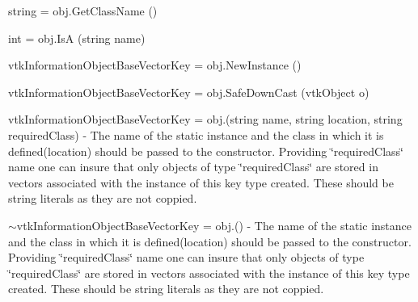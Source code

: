 \begin{DoxyItemize}
\item {\ttfamily string = obj.\-Get\-Class\-Name ()}  
\item {\ttfamily int = obj.\-Is\-A (string name)}  
\item {\ttfamily vtk\-Information\-Object\-Base\-Vector\-Key = obj.\-New\-Instance ()}  
\item {\ttfamily vtk\-Information\-Object\-Base\-Vector\-Key = obj.\-Safe\-Down\-Cast (vtk\-Object o)}  
\item {\ttfamily vtk\-Information\-Object\-Base\-Vector\-Key = obj.(string name, string location, string required\-Class)} -\/ The name of the static instance and the class in which it is defined(location) should be passed to the constructor. Providing \char`\"{}required\-Class\char`\"{} name one can insure that only objects of type \char`\"{}required\-Class\char`\"{} are stored in vectors associated with the instance of this key type created. These should be string literals as they are not coppied.  
\item {\ttfamily $\sim$vtk\-Information\-Object\-Base\-Vector\-Key = obj.()} -\/ The name of the static instance and the class in which it is defined(location) should be passed to the constructor. Providing \char`\"{}required\-Class\char`\"{} name one can insure that only objects of type \char`\"{}required\-Class\char`\"{} are stored in vectors associated with the instance of this key type created. These should be string literals as they are not coppied.



\end{DoxyItemize}
